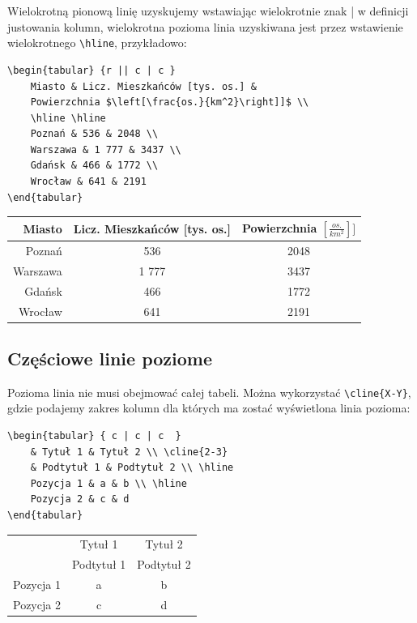 \documentclass[10pt,a4paper]{article}
\begin{document}
Wielokrotną pionową linię uzyskujemy wstawiając wielokrotnie znak \lstinline||| w definicji justowania kolumn, wielokrotna pozioma linia uzyskiwana jest przez wstawienie wielokrotnego \lstinline|\hline|, przykładowo:

\begin{lstlisting}
\begin{tabular} {r || c | c }
	Miasto & Licz. Mieszkańców [tys. os.] & 
	Powierzchnia $\left[\frac{os.}{km^2}\right]]$ \\ 
	\hline \hline
	Poznań & 536 & 2048 \\
	Warszawa & 1 777 & 3437 \\
	Gdańsk & 466 & 1772 \\
	Wrocław & 641 & 2191
\end{tabular}
\end{lstlisting}

\begin{tabular} {r || c | c }
	Miasto & Licz. Mieszkańców [tys. os.] & 
	Powierzchnia $\left[\frac{os.}{km^2}\right]]$ \\ \hline \hline
	Poznań & 536 & 2048 \\
	Warszawa & 1 777 & 3437 \\
	Gdańsk & 466 & 1772 \\
	Wrocław & 641 & 2191
\end{tabular}

\subsection{Częściowe linie poziome}

Pozioma linia nie musi obejmować całej tabeli. Można wykorzystać \lstinline|\cline{X-Y}|, gdzie podajemy zakres kolumn dla których ma zostać wyświetlona linia pozioma:

\begin{lstlisting}
\begin{tabular} { c | c | c  }
	& Tytuł 1 & Tytuł 2 \\ \cline{2-3}
	& Podtytuł 1 & Podtytuł 2 \\ \hline
	Pozycja 1 & a & b \\ \hline
	Pozycja 2 & c & d
\end{tabular}
\end{lstlisting}

\begin{tabular} { c | c | c  }
	& Tytuł 1 & Tytuł 2 \\ \cline{2-3}
	& Podtytuł 1 & Podtytuł 2 \\ \hline
	Pozycja 1 & a & b \\ \hline
	Pozycja 2 & c & d
\end{tabular}
\end{document}
